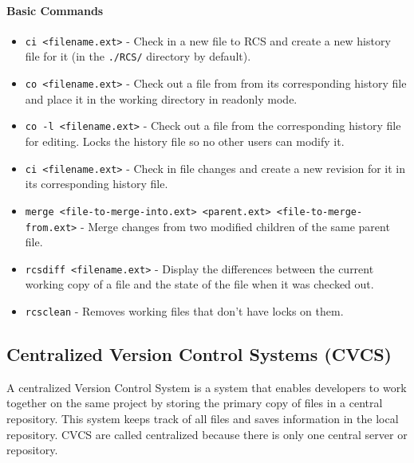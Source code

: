 \paragraph{Basic Commands}

\begin{itemize}
    \item \lstinline{ci <filename.ext>} - Check in a new file to RCS and create a new history file for it (in the \lstinline{./RCS/} directory by default).
    \item \lstinline{co <filename.ext>} - Check out a file from from its corresponding history file and place it in the working directory in readonly mode.
    \item \lstinline{co -l <filename.ext>} - Check out a file from the corresponding history file for editing. Locks the history file so no other users can modify it.
    \item \lstinline{ci <filename.ext>} - Check in file changes and create a new revision for it in its corresponding history file.
    \item \lstinline{merge <file-to-merge-into.ext> <parent.ext> <file-to-merge-from.ext>} - Merge changes from two modified children of the same parent file.
    \item \lstinline{rcsdiff <filename.ext>} - Display the differences between the current working copy of a file and the state of the file when it was checked out.
    \item \lstinline{rcsclean} - Removes working files that don't have locks on them.
\end{itemize}

\subsection{Centralized Version Control Systems (CVCS)}
A centralized Version Control System is a system that enables developers to work together on the same project by storing the primary copy of files in a central repository. This system keeps track of all files and saves information in the local repository. CVCS are called centralized because there is only one central server or repository.

